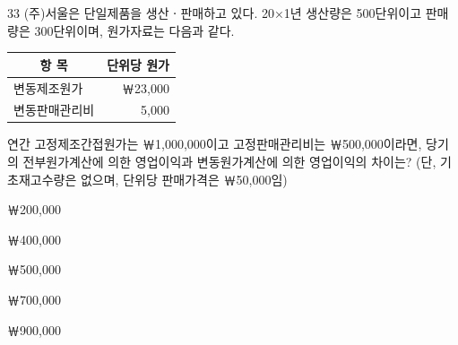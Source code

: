\begin{question}{33}
(주)서울은 단일제품을 생산ㆍ판매하고 있다. 20×1년 생산량은 500단위이고 판매량은 300단위이며, 원가자료는 다음과 같다.

{\small\centering
\begin{tabular}{|l|r|}
\hline
\multicolumn{1}{|c|}{항 목} & \multicolumn{1}{c|}{단위당 원가} \\
\hline
변동제조원가 & ￦23,000 \\
\hline
변동판매관리비 & 5,000 \\
\hline
\end{tabular}\par}

연간 고정제조간접원가는 ￦1,000,000이고 고정판매관리비는 ￦500,000이라면, 당기의 전부원가계산에 의한 영업이익과 변동원가계산에 의한 영업이익의 차이는? (단, 기초재고수량은 없으며, 단위당 판매가격은 ￦50,000임) \par
\begin{choices}
  \item ￦200,000
  \item ￦400,000
  \item ￦500,000
  \item ￦700,000
  \item ￦900,000
\end{choices}
\end{question}
